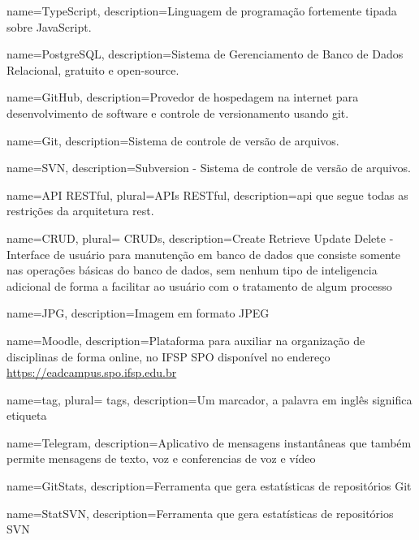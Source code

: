  {
	name=TypeScript,
	description={Linguagem de programação fortemente tipada sobre JavaScript.}
}

 {
	name=PostgreSQL,
	description={Sistema de Gerenciamento de Banco de Dados Relacional, gratuito e open-source.}
}

 {
	name=GitHub,
	description={Provedor de hospedagem na internet para desenvolvimento de software e controle de versionamento usando \gls{git}.}
}

 {
	name=Git,
	description={Sistema de controle de versão de arquivos.}
}

 {
	name=SVN,
	description={Subversion - Sistema de controle de versão de arquivos.}
}

 {
	name=API RESTful,
	plural=APIs RESTful,
	description={\ac{api} que segue todas as restrições da arquitetura \ac{rest}.}
}


 



 {
    name=CRUD,
    plural= {CRUDs},
    description={Create Retrieve Update Delete - Interface de usuário para manutenção em banco de dados que consiste somente nas operações básicas do banco de dados, sem nenhum tipo de inteligencia adicional de forma a facilitar ao usuário com o tratamento de algum processo}
}

 {
    name=JPG,
    description={Imagem em formato JPEG}
}

 {
    name=Moodle,
    description={Plataforma para auxiliar na organização de disciplinas de forma online, no IFSP SPO disponível no endereço \url{https://eadcampus.spo.ifsp.edu.br}}
}


 {
    name=tag,
    plural= {tags},
    description={Um marcador, a palavra em inglês significa etiqueta}
}
                
 {
    name=Telegram,
    description={Aplicativo de mensagens instantâneas que também permite mensagens de texto, voz e conferencias de voz e vídeo}
}

 {
	name=GitStats,
	description={Ferramenta que gera estatísticas de repositórios Git}
}

 {
	name=StatSVN,
	description={Ferramenta que gera estatísticas de repositórios SVN}
}

